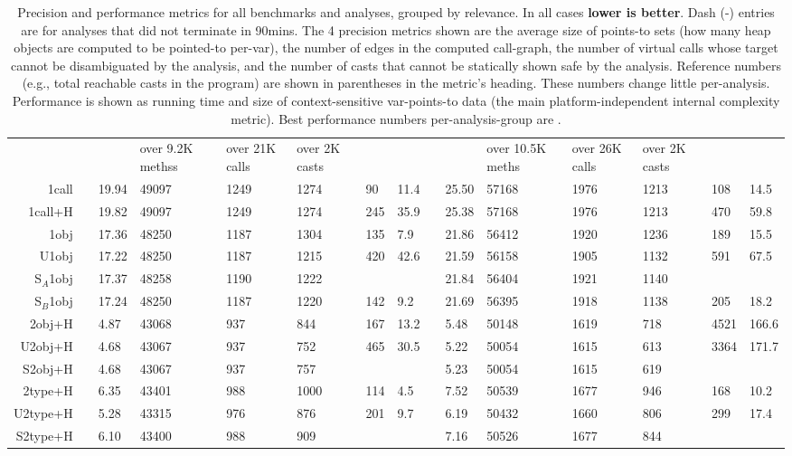 \begin{table}
{\begin{tabular}{|r|c|l|p{1cm}|p{1cm}|p{1cm}!{\vrule width 2pt}l|l!{\vrule width 2pt}c|l|p{1cm}|p{1cm}|p{1cm}!{\vrule width 2pt}l|l|}
 &
over 9.2K methss &
over 21K calls &
over 2K casts &
 &
over 10.5K meths &
over 26K calls &
over 2K casts &
 \\
1call &  & 19.94 & 49097 & 1249 & 1274 & 90 & 11.4 &  & 25.50 & 57168 & 1976 & 1213 & 108 & 14.5 \\
1call+H & & 19.82 & 49097 & 1249 & 1274 & 245 & 35.9 & & 25.38 & 57168 & 1976 & 1213 & 470 & 59.8 \\
1obj & & 17.36 & 48250 & 1187 & 1304 & 135 & 7.9 & & 21.86 & 56412 & 1920 & 1236 & 189 & 15.5 \\
U1obj & & 17.22 & 48250 & 1187 & 1215 & 420 & 42.6 & & 21.59 & 56158 & 1905 & 1132 & 591 & 67.5 \\
S$_A$1obj & & 17.37 & 48258 & 1190 & 1222 &  &  & & 21.84 & 56404 & 1921 & 1140 &  &  \\
S$_B$1obj & & 17.24 & 48250 & 1187 & 1220 & 142 & 9.2 & & 21.69 & 56395 & 1918 & 1138 & 205 & 18.2 \\
2obj+H & & 4.87 & 43068 & 937 & 844 & 167 & 13.2 & & 5.48 & 50148 & 1619 & 718 & 4521 & 166.6 \\
U2obj+H & & 4.68 & 43067 & 937 & 752 & 465 & 30.5 & & 5.22 & 50054 & 1615 & 613 & 3364 & 171.7 \\
S2obj+H & & 4.68 & 43067 & 937 & 757 &  &  & & 5.23 & 50054 & 1615 & 619 &  &  \\
2type+H & & 6.35 & 43401 & 988 & 1000 & 114 & 4.5 & & 7.52 & 50539 & 1677 & 946 & 168 & 10.2 \\
U2type+H & & 5.28 & 43315 & 976 & 876 & 201 & 9.7 & & 6.19 & 50432 & 1660 & 806 & 299 & 17.4 \\
S2type+H & & 6.10 & 43400 & 988 & 909 &  &  & & 7.16 & 50526 & 1677 & 844 &  &  \\
\end{tabular}
} %
\caption[]{Precision and performance metrics for all benchmarks and analyses, grouped by relevance. In all cases \textbf{lower is better}. Dash (-) entries are for analyses that did not terminate in 90mins. The 4 precision metrics shown are the average size of points-to sets (how many heap objects are computed to be pointed-to per-var), the number of edges in the computed call-graph, the number of virtual calls whose target cannot be disambiguated by the analysis, and the number of casts that cannot be statically shown safe by the analysis. Reference numbers (e.g., total reachable casts in the program) are shown in parentheses in the metric's heading. These numbers change little per-analysis. Performance is shown as running time and size of context-sensitive var-points-to data (the main platform-independent internal complexity metric). Best performance numbers per-analysis-group are .}

\end{table}

